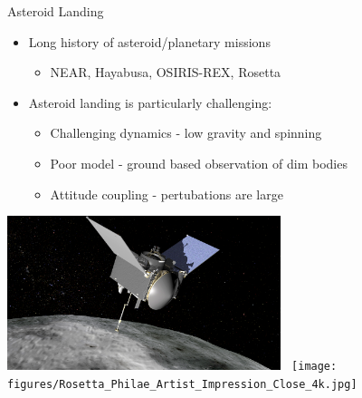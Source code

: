\documentclass[11pt,professionalfonts]{beamer}
\begin{document}
\begin{frame}{Asteroid Landing}
    \begin{itemize}
        \item Long history of asteroid/planetary missions
            \begin{itemize}
                \item NEAR, Hayabusa, OSIRIS-REX, Rosetta
            \end{itemize}
            \pause
        \item Asteroid landing is particularly challenging:
            \begin{itemize}
                \item<3-> Challenging dynamics - low gravity and spinning
                \item<4-> Poor model - ground based observation of dim bodies
                \item<5-> Attitude coupling - pertubations are large 
            \end{itemize}
    \end{itemize}
    \begin{center}
        \includegraphics[width=0.6\textwidth,height=0.4\textheight,keepaspectratio]{figures/osiris_rex.png}~
        \texttt{[image: figures/Rosetta\_Philae\_Artist\_Impression\_Close\_4k.jpg]}
    \end{center} 
\end{frame}
\end{document}
